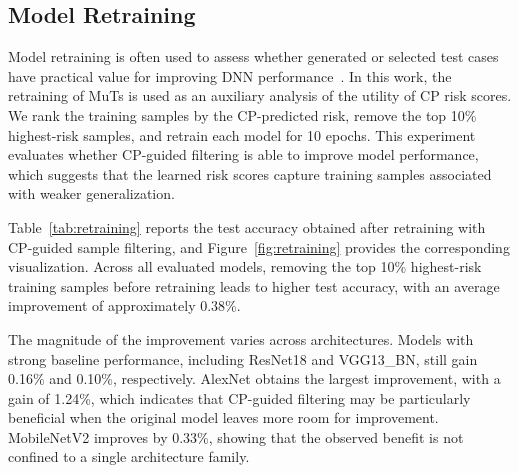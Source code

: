 \documentclass[preprint,number,5p,twocolumn]{elsarticle}
\begin{document}
\subsection{Model Retraining}

Model retraining is often used to assess whether generated or selected test cases have practical value for improving DNN performance~\cite{deepconcolic}. In this work, the retraining of MuTs is used as an auxiliary analysis of the utility of CP risk scores. We rank the training samples by the CP-predicted risk, remove the top 10\% highest-risk samples, and retrain each model for 10 epochs. This experiment evaluates whether CP-guided filtering is able to improve model performance, which suggests that the learned risk scores capture training samples associated with weaker generalization.

\begin{table}[!htbp]
  \centering
  \caption{Model retraining results. Accuracy improvements after removing CP-identified high-risk samples and retraining.}\label{tab:retraining}
\end{table}
Table~\ref{tab:retraining} reports the test accuracy obtained after retraining with CP-guided sample filtering, and Figure~\ref{fig:retraining} provides the corresponding visualization. Across all evaluated models, removing the top 10\% highest-risk training samples before retraining leads to higher test accuracy, with an average improvement of approximately 0.38\%.

The magnitude of the improvement varies across architectures. Models with strong baseline performance, including ResNet18 and VGG13\_BN, still gain 0.16\% and 0.10\%, respectively. AlexNet obtains the largest improvement, with a gain of 1.24\%, which indicates that CP-guided filtering may be particularly beneficial when the original model leaves more room for improvement. MobileNetV2 improves by 0.33\%, showing that the observed benefit is not confined to a single architecture family.
\end{document}

